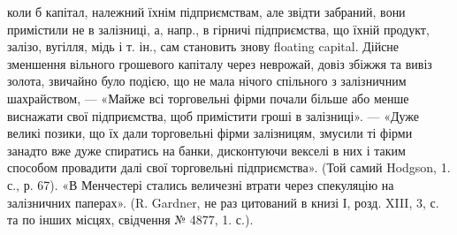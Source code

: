 коли б капітал, належний їхнім підприємствам, але звідти забраний, вони примістили
не в залізниці, а, напр., в гірничі підприємства, що їхній продукт,
залізо, вугілля, мідь і т. ін., сам становить знову floating capital. Дійсне зменшення
вільного грошевого капіталу через неврожай, довіз збіжжя та вивіз
золота, звичайно було подією, що не мала нічого спільного з залізничним
шахрайством, — «Майже всі торговельні фірми почали більше або менше виснажати
свої підприємства, щоб примістити гроші в залізниці». — «Дуже великі позики,
що їх дали торговельні фірми залізницям, змусили ті фірми занадто вже дуже
спиратись на банки, дисконтуючи векселі в них і таким способом провадити
далі свої торговельні підприємства». (Той самий Hodgson, 1. с., р. 67). «В Менчестері
стались величезні втрати через спекуляцію на залізничних паперах».
(R. Gardner, не раз цитований в книзі І, розд. XIII, 3, с. та по інших місцях,
свідчення № 4877, 1. с.).

